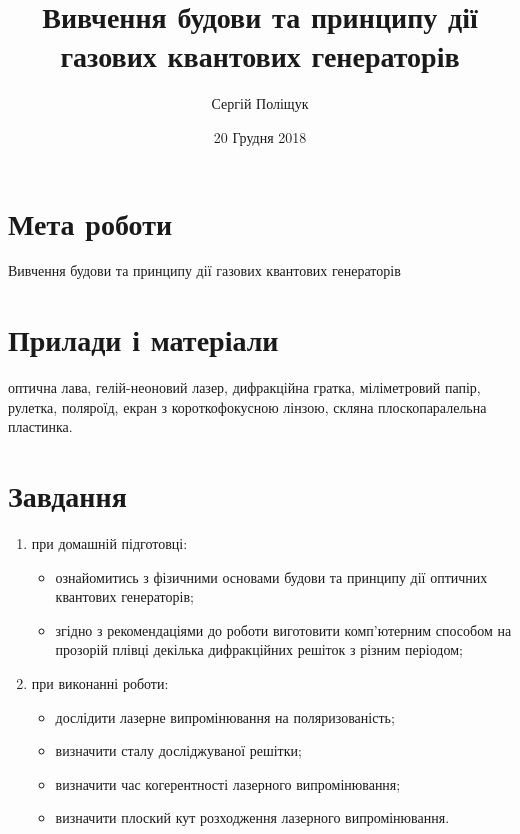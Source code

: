 \documentclass[twocolumn]{el-author}
\date{20 Грудня 2018}
\begin{document}
\title{Вивчення будови та принципу дії газових квантових генераторів}

\author{Сергій Поліщук}

\maketitle

\section{Мета роботи}

Вивчення будови та принципу дії газових квантових генераторів

\section{Прилади і матеріали}

оптична лава, гелій-неоновий лазер, дифракційна
гратка, міліметровий папір, рулетка, поляроїд, екран з
короткофокусною лінзою, скляна плоскопаралельна
пластинка.

\section{Завдання}

\begin{enumerate}
	\item при домашній підготовці:
	\begin{itemize}
		\item  ознайомитись з фізичними основами будови та принципу дії
оптичних квантових генераторів;
		\item  згідно з рекомендаціями до роботи виготовити
комп'ютерним способом на прозорій плівці декілька
дифракційних решіток з різним періодом;
	\end{itemize}
	\item при виконанні роботи:
	\begin{itemize}
		\item  дослідити лазерне випромінювання на поляризованість;
		\item  визначити сталу досліджуваної решітки;
		\item  визначити час когерентності лазерного випромінювання;
		\item  визначити плоский кут розходження лазерного
випромінювання.
	\end{itemize}
	
\end{enumerate}
\end{document}
